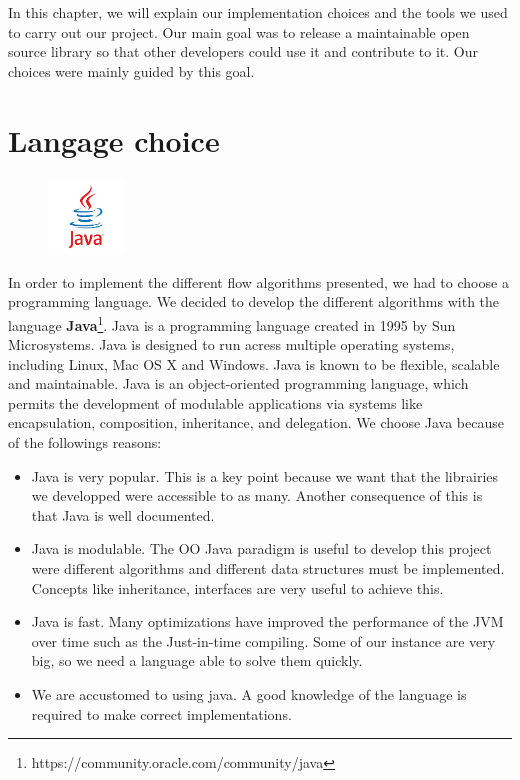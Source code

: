 In this chapter, we will explain our implementation choices and the tools we used to carry out our project. Our main goal was to release a maintainable open source library so that other developers could use it and contribute to it. Our choices were mainly guided by this goal.

\section{Langage choice}

\begin{figure}
	\vspace{-8mm}
	\includegraphics[width =2cm]{images/Java_logo.png}
\end{figure}

In order to implement the different flow algorithms presented, we had to choose a programming language. We decided to develop the different algorithms with the language \textbf{Java}\footnote{https://community.oracle.com/community/java}. Java is a programming language created in 1995 by Sun Microsystems. Java is designed to run acress multiple operating systems, including Linux, Mac OS X and Windows. Java is known to be flexible, scalable and maintainable. Java is an object-oriented programming language, which permits the development of modulable applications via systems like encapsulation, composition, inheritance, and delegation. We choose Java because of the followings reasons:
\begin{itemize}
	\item Java is very popular. This is a key point because we want that the librairies we developped were accessible to as many. Another consequence of this is that Java is well documented.
	\item Java is modulable. The OO Java paradigm is useful to develop this project were different algorithms and different data structures must be implemented. Concepts like inheritance, interfaces are very useful to achieve this.
	\item Java is fast. Many optimizations have improved the performance of the JVM over time such as the Just-in-time compiling. Some of our instance are very big, so we need a language able to solve them quickly.
	\item We are accustomed to using java. A good knowledge of the language is required to make correct implementations.
\end{itemize}


